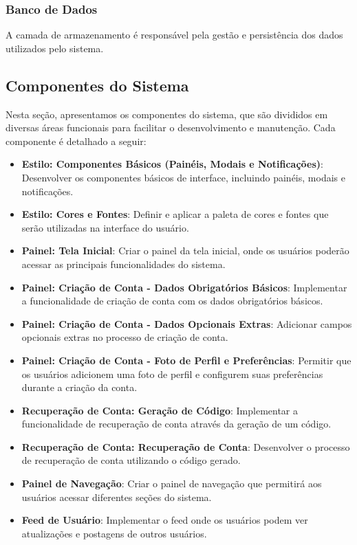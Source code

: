\documentclass[../main.tex]{subfiles}
\begin{document}
\subsubsection{Banco de Dados}
A camada de armazenamento é responsável pela gestão e persistência dos dados utilizados pelo sistema.

\subsection{Componentes do Sistema}

Nesta seção, apresentamos os componentes do sistema, que são divididos em diversas áreas funcionais para facilitar o desenvolvimento e manutenção. Cada componente é detalhado a seguir:

\begin{itemize}
    \item \textbf{Estilo: Componentes Básicos (Painéis, Modais e Notificações)}: Desenvolver os componentes básicos de interface, incluindo painéis, modais e notificações.
    \item \textbf{Estilo: Cores e Fontes}: Definir e aplicar a paleta de cores e fontes que serão utilizadas na interface do usuário.
    \item \textbf{Painel: Tela Inicial}: Criar o painel da tela inicial, onde os usuários poderão acessar as principais funcionalidades do sistema.
    \item \textbf{Painel: Criação de Conta - Dados Obrigatórios Básicos}: Implementar a funcionalidade de criação de conta com os dados obrigatórios básicos.
    \item \textbf{Painel: Criação de Conta - Dados Opcionais Extras}: Adicionar campos opcionais extras no processo de criação de conta.
    \item \textbf{Painel: Criação de Conta - Foto de Perfil e Preferências}: Permitir que os usuários adicionem uma foto de perfil e configurem suas preferências durante a criação da conta.
    \item \textbf{Recuperação de Conta: Geração de Código}: Implementar a funcionalidade de recuperação de conta através da geração de um código.
    \item \textbf{Recuperação de Conta: Recuperação de Conta}: Desenvolver o processo de recuperação de conta utilizando o código gerado.
    \item \textbf{Painel de Navegação}: Criar o painel de navegação que permitirá aos usuários acessar diferentes seções do sistema.
    \item \textbf{Feed de Usuário}: Implementar o feed onde os usuários podem ver atualizações e postagens de outros usuários.

\end{itemize}
\end{document}
